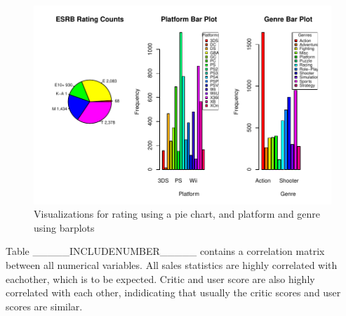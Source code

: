 \documentclass[12pt]{article}
\begin{document}
\begin{figure}[tbp]
  \centering
  \includegraphics[width=\textwidth]{categoricalplots.pdf}
  \caption{Visualizations for rating using a pie chart, and platform and genre using barplots}
  \label{fig:categoricalplots}
\end{figure}


Table _____INCLUDENUMBER_____ contains a correlation matrix between all numerical variables. All sales statistics are highly
correlated with eachother, which is to be expected. Critic and user score are also highly correlated with each other, indidicating
that usually the critic scores and user scores are similar.
\end{document}
